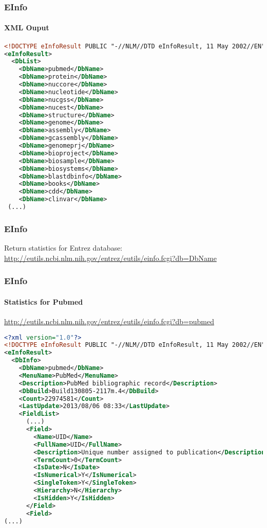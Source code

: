 \documentclass{beamer}
\begin{document}
\begin{frame}[fragile]
\frametitle{EInfo}
\framesubtitle{XML Ouput}

\small
\begin{lstlisting}[language=xml]
<!DOCTYPE eInfoResult PUBLIC "-//NLM//DTD eInfoResult, 11 May 2002//EN" "http://www.ncbi.nlm.nih.gov/entrez/query/DTD/eInfo_020511.dtd">
<eInfoResult>
  <DbList>
    <DbName>pubmed</DbName>
    <DbName>protein</DbName>
    <DbName>nuccore</DbName>
    <DbName>nucleotide</DbName>
    <DbName>nucgss</DbName>
    <DbName>nucest</DbName>
    <DbName>structure</DbName>
    <DbName>genome</DbName>
    <DbName>assembly</DbName>
    <DbName>gcassembly</DbName>
    <DbName>genomeprj</DbName>
    <DbName>bioproject</DbName>
    <DbName>biosample</DbName>
    <DbName>biosystems</DbName>
    <DbName>blastdbinfo</DbName>
    <DbName>books</DbName>
    <DbName>cdd</DbName>
    <DbName>clinvar</DbName>
 (...)
\end{lstlisting}
\end{frame}


\begin{frame}[fragile]
\frametitle{EInfo}
Return statistics for Entrez database:\\
\small
\url{http://eutils.ncbi.nlm.nih.gov/entrez/eutils/einfo.fcgi?db=DbName}
\end{frame}


\begin{frame}[fragile]
\frametitle{EInfo}
\framesubtitle{Statistics for Pubmed}
\url{http://eutils.ncbi.nlm.nih.gov/entrez/eutils/einfo.fcgi?db=pubmed}
\begin{lstlisting}[language=xml,basicstyle=\tiny,breaklines=false]
<?xml version="1.0"?>
<!DOCTYPE eInfoResult PUBLIC "-//NLM//DTD eInfoResult, 11 May 2002//EN" "http://www.ncbi.nlm.nih.gov/entrez/query/DTD/eInfo_020511.dtd">
<eInfoResult>
  <DbInfo>
    <DbName>pubmed</DbName>
    <MenuName>PubMed</MenuName>
    <Description>PubMed bibliographic record</Description>
    <DbBuild>Build130805-2117m.4</DbBuild>
    <Count>22974581</Count>
    <LastUpdate>2013/08/06 08:33</LastUpdate>
    <FieldList>
      (...)
      <Field>
        <Name>UID</Name>
        <FullName>UID</FullName>
        <Description>Unique number assigned to publication</Description>
        <TermCount>0</TermCount>
        <IsDate>N</IsDate>
        <IsNumerical>Y</IsNumerical>
        <SingleToken>Y</SingleToken>
        <Hierarchy>N</Hierarchy>
        <IsHidden>Y</IsHidden>
      </Field>
      <Field>
(...)
\end{lstlisting}
\end{frame}
\end{document}
